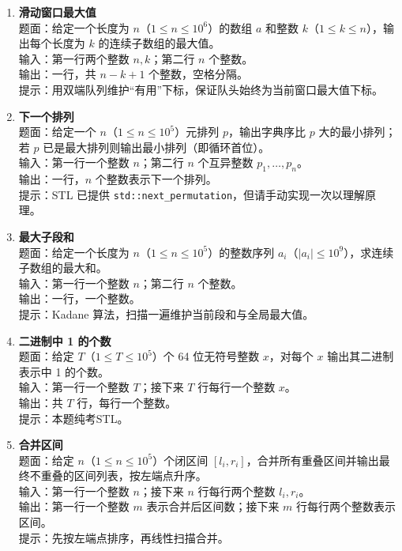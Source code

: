 \documentclass{article}
\begin{document}
\begin{enumerate}[label=\textbf{M\arabic*.}]
  \item \textbf{滑动窗口最大值}\\
    题面：给定一个长度为 $n$（$1\le n\le 10^6$）的数组 $a$ 和整数 $k$（$1\le k\le n$），输出每个长度为 $k$ 的连续子数组的最大值。\\
    输入：第一行两个整数 $n,k$；第二行 $n$ 个整数。\\
    输出：一行，共 $n-k+1$ 个整数，空格分隔。\\
    提示：用双端队列维护“有用”下标，保证队头始终为当前窗口最大值下标。

  \item \textbf{下一个排列}\\
    题面：给定一个 $n$（$1\le n\le 10^5$）元排列 $p$，输出字典序比 $p$ 大的最小排列；若 $p$ 已是最大排列则输出最小排列（即循环首位）。\\
    输入：第一行一个整数 $n$；第二行 $n$ 个互异整数 $p_1,\dots ,p_n$。\\
    输出：一行，$n$ 个整数表示下一个排列。\\
    提示：STL 已提供 \texttt{std::next\_permutation}，但请手动实现一次以理解原理。

  \item \textbf{最大子段和}\\
    题面：给定一个长度为 $n$（$1\le n\le 10^5$）的整数序列 $a_i$（$|a_i|\le 10^9$），求连续子数组的最大和。\\
    输入：第一行一个整数 $n$；第二行 $n$ 个整数。\\
    输出：一行，一个整数。\\
    提示：Kadane 算法，扫描一遍维护当前段和与全局最大值。

  \item \textbf{二进制中 1 的个数}\\
    题面：给定 $T$（$1\le T\le 10^5$）个 64 位无符号整数 $x$，对每个 $x$ 输出其二进制表示中 1 的个数。\\
    输入：第一行一个整数 $T$；接下来 $T$ 行每行一个整数 $x$。\\
    输出：共 $T$ 行，每行一个整数。\\
    提示：本题纯考STL。

  \item \textbf{合并区间}\\
    题面：给定 $n$（$1\le n\le 10^5$）个闭区间 $[l_i,r_i]$，合并所有重叠区间并输出最终不重叠的区间列表，按左端点升序。\\
    输入：第一行一个整数 $n$；接下来 $n$ 行每行两个整数 $l_i,r_i$。\\
    输出：第一行一个整数 $m$ 表示合并后区间数；接下来 $m$ 行每行两个整数表示区间。\\
    提示：先按左端点排序，再线性扫描合并。
\end{enumerate}
\end{document}
